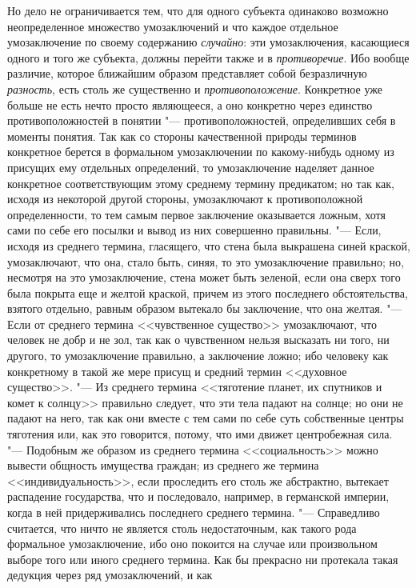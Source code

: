 {{Но дело не ограничивается тем, что для одного субъекта
одинаково возможно неопределенное множество умозаключений и что каждое
отдельное умозаключение по своему содержанию
{\em случайно}: эти
умозаключения, касающиеся одного и того же субъекта, должны перейти также и
в {\em противоречие}. Ибо
вообще различие, которое ближайшим образом представляет собой безразличную
{\em разность}, есть
столь же существенно и
{\em противоположение}.
Конкретное уже больше не есть нечто просто являющееся, а оно
конкретно через единство противоположностей в понятии
"--- противоположностей, определивших себя в моменты понятия.
Так как со стороны качественной природы терминов конкретное берется в
формальном умозаключении по какому-нибудь одному из присущих ему отдельных
определений, то умозаключение наделяет данное конкретное соответствующим
этому среднему термину предикатом; но так как, исходя из некоторой другой
стороны, умозаключают к противоположной определенности, то тем самым первое
заключение оказывается ложным, хотя сами по себе его посылки и вывод из них
совершенно правильны. "--- Если, исходя из среднего термина,
гласящего, что стена была выкрашена синей краской, умозаключают, что она,
стало быть, синяя, то это умозаключение правильно; но, несмотря на это
умозаключение, стена может быть зеленой, если она сверх того была покрыта
еще и желтой краской, причем из этого последнего обстоятельства, взятого
отдельно, равным образом вытекало бы заключение, что она
желтая. "--- Если от среднего термина <<чувственное существо>>
умозаключают, что человек не добр и не зол, так как о чувственном нельзя
высказать ни того, ни другого, то умозаключение правильно, а заключение
ложно; ибо человеку как конкретному в такой же мере присущ и средний термин
<<духовное существо>>. "--- Из среднего термина <<тяготение
планет, их спутников и комет к солнцу>> правильно следует, что эти тела
падают на солнце; но они не падают на него, так как они вместе с тем сами
по себе суть собственные центры тяготения или, как это говорится, потому,
что ими движет центробежная сила. "--- Подобным же образом из
среднего термина <<социальность>> можно вывести общность имущества граждан;
из среднего же термина <<индивидуальность>>, если проследить его столь же
абстрактно, вытекает распадение государства, что и последовало, например, в
германской империи, когда в ней придерживались последнего среднего
термина. "--- Справедливо считается, что ничто не является
столь недостаточным, как такого рода формальное умозаключение, ибо оно
покоится на случае или произвольном выборе того или иного среднего термина.
Как бы прекрасно ни протекала такая дедукция через ряд умозаключений, и как
}}
